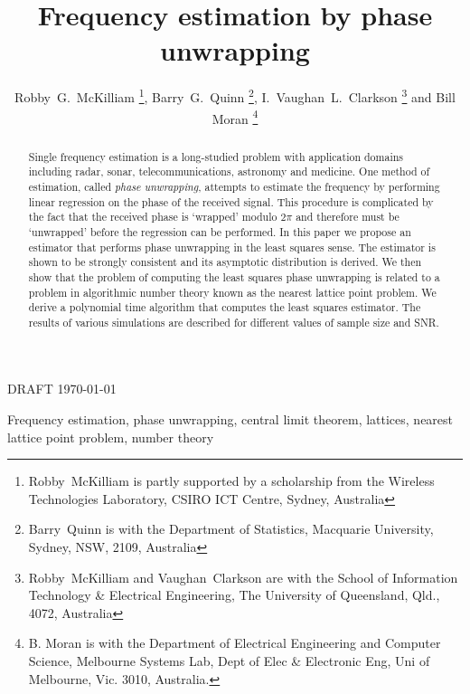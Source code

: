 \documentclass[journal]{IEEEtran}
\begin{document}
\title{Frequency estimation by phase unwrapping}

\author{Robby~G.~McKilliam%
  \thanks{Robby~McKilliam is partly supported by a scholarship from
    the Wireless Technologies Laboratory, CSIRO ICT Centre, Sydney,
    Australia}, Barry~G.~Quinn%
  \thanks{Barry~Quinn is with the Department of Statistics, Macquarie
    University, Sydney, NSW, 2109, Australia}, I.~Vaughan~L.~Clarkson%
  \thanks{Robby~McKilliam and Vaughan~Clarkson are with the School of
    Information Technology \& Electrical Engineering, The University
    of Queensland, Qld., 4072, Australia} and Bill Moran
    \thanks{B. Moran is with the Department of Electrical Engineering and Computer
Science, Melbourne Systems Lab, Dept of Elec \& Electronic Eng, Uni of Melbourne, Vic. 3010, Australia.} }
%
{DRAFT \today}

\maketitle

 
\begin{abstract}
  Single frequency estimation is a long-studied problem with application domains
  including radar, sonar, telecommunications, astronomy and medicine.  One
  method of estimation, called \emph{phase unwrapping}, attempts to estimate
  the frequency by performing linear regression on the phase of the received
  signal.  This procedure is complicated by the fact that the received phase
  is `wrapped' modulo $2\pi$ and therefore must be `unwrapped' before the
  regression can be performed.  In this paper we propose an estimator that
  performs phase unwrapping in the least squares sense.  The estimator is
  shown to be strongly consistent and its asymptotic distribution is
  derived. We then show that the problem of computing the least squares phase
  unwrapping is related to a problem in algorithmic number theory known as the
  nearest lattice point problem.  We derive a polynomial time algorithm that
  computes the least squares estimator.  The results of various simulations
  are described for different values of sample size and SNR.
\end{abstract}

\begin{IEEEkeywords}
Frequency estimation, phase unwrapping, central limit theorem, lattices, nearest lattice point problem, number theory
\end{IEEEkeywords}
\end{document}
